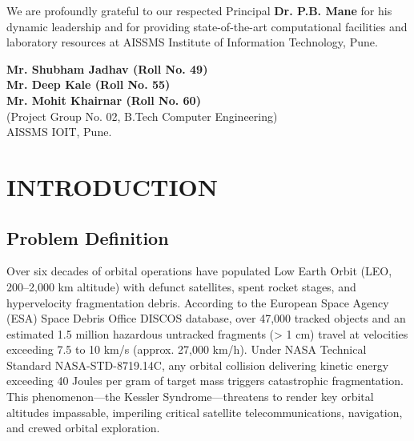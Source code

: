 \documentclass[12pt]{report}
\begin{document}
We are profoundly grateful to our respected Principal \textbf{Dr. P.B. Mane} for his dynamic leadership and for providing state-of-the-art computational facilities and laboratory resources at AISSMS Institute of Information Technology, Pune.

\vspace{20mm} 
\begin{flushright}
\begin{minipage}{2.8 in}
\textbf{Mr. Shubham Jadhav (Roll No. 49)}\\
\textbf{Mr. Deep Kale (Roll No. 55)}\\
\textbf{Mr. Mohit Khairnar (Roll No. 60)}\\
(Project Group No. 02, B.Tech Computer Engineering)\\
AISSMS IOIT, Pune.
\end{minipage}
\end{flushright}

\newpage

\tableofcontents
\newpage
{}
\listoffigures
\newpage
{}
\listoftables
\newpage


\chapter{INTRODUCTION}
\section{Problem Definition}
Over six decades of orbital operations have populated Low Earth Orbit (LEO, 200--2,000 km altitude) with defunct satellites, spent rocket stages, and hypervelocity fragmentation debris. According to the European Space Agency (ESA) Space Debris Office DISCOS database, over 47,000 tracked objects and an estimated 1.5 million hazardous untracked fragments (> 1 cm) travel at velocities exceeding 7.5 to 10 km/s (approx. 27,000 km/h). Under NASA Technical Standard NASA-STD-8719.14C, any orbital collision delivering kinetic energy exceeding 40 Joules per gram of target mass triggers catastrophic fragmentation. This phenomenon---the Kessler Syndrome---threatens to render key orbital altitudes impassable, imperiling critical satellite telecommunications, navigation, and crewed orbital exploration.
\end{document}
